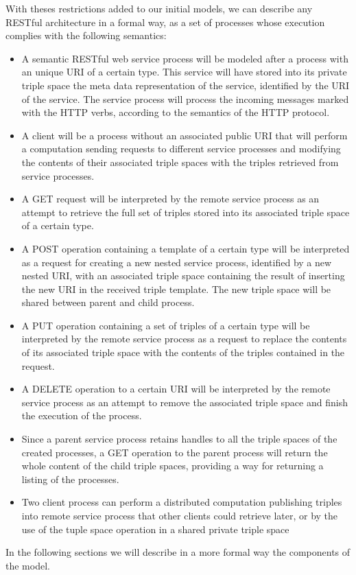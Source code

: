 With theses restrictions added to our initial models, we can describe any RESTful architecture in a formal way, as a set
of processes whose execution complies with the following semantics:
\begin{itemize}
\item A semantic RESTful web service process will be modeled after a process with an unique URI of a certain type. This service will
  have stored into its private triple space the meta data representation of the service, identified by the URI of the
  service. The service process will process the incoming messages marked with the HTTP verbs, according to the semantics of the HTTP
  protocol.
\item A client will be a process without an associated public URI that will perform a computation sending requests to
  different service processes and modifying the contents of their associated triple spaces with the triples retrieved from
  service processes.
\item A GET request will be interpreted by the remote service process as an attempt to retrieve the full set of triples
  stored into its associated triple space of a certain type.
\item A POST operation containing a template of a certain type will be interpreted as a request for creating a new
  nested service process, identified by a new nested URI, with an associated triple space containing the result of
  inserting the new URI in the received triple template. The new triple space will be shared between parent and child
  process.
\item A PUT operation containing a set of triples of a certain type will be interpreted by the remote service process as a
  request to replace the contents of its associated triple space with the contents of the triples contained in the
  request.
\item A DELETE operation to a certain URI will be interpreted by the remote service process as an attempt to remove
  the associated triple space and finish the execution of the process. 
\item Since a parent service process retains handles to all the triple spaces of the created processes, a GET operation
  to the parent process will return the whole content of the child triple spaces, providing a way for returning a
  listing of the processes.
\item Two client process can perform a distributed computation publishing triples into remote service process that other
  clients could retrieve later, or by the use of the tuple space operation in a shared private triple space
\end{itemize}
In the following sections we will describe in a more formal way the components of the model.

